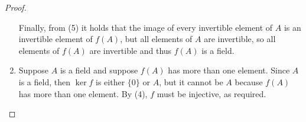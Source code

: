 \begin{proof}
\begin{enumerate}
     Finally, from (5) it holds that the image of every invertible element of $A$ is an invertible element of $f(A)$, but all elements of $A$ are invertible, so all elements of $f(A)$ are invertible and thus $f(A)$ is a field.
     \item Suppose $A$ is a field and suppose $f(A)$ has more than one element. Since $A$ is a field, then $\ker f$ is either $\{0\}$ or $A$, but it cannot be $A$ because $f(A)$ has more than one element. By (4), $f$ must be injective, as required.
 \end{enumerate}
\end{proof}